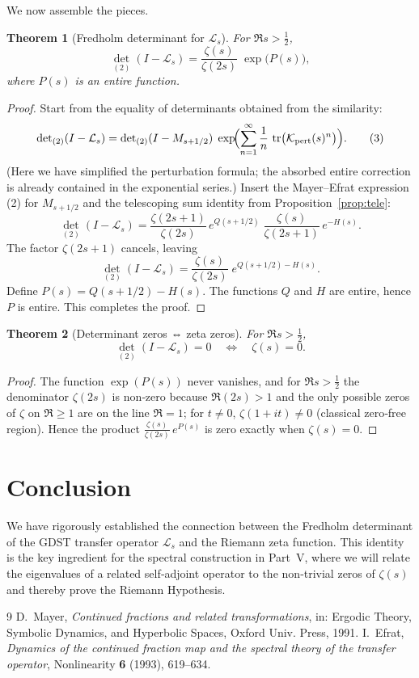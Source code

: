 \documentclass[11pt,a4paper]{article}
\newtheorem{theorem}{Theorem}[section]
\theoremstyle{definition}
\theoremstyle{remark}
\newcommand{\LOp}{\mathcal{L}}
\newcommand{\MOp}{M}
\newcommand{\KO}{\mathcal{K}}
\newcommand{\tr}{\operatorname{tr}}
\newcommand{\Det}{\operatorname{det}}
\begin{document}
We now assemble the pieces.

\begin{theorem}[Fredholm determinant for \(\LOp_s\)]\label{thm:fredholmL}
For \(\Re s > \frac12\),
\[
{\Det}_{(2)}(I - \LOp_s) = \frac{\zeta(s)}{\zeta(2s)}\; \exp\bigl(P(s)\bigr),
\]
where \(P(s)\) is an entire function.
\end{theorem}
\begin{proof}
Start from the equality of determinants obtained from the similarity:
\[
{\Det}_{(2)}(I - \LOp_s) = {\Det}_{(2)}(I - \MOp_{s+1/2})\;
\exp\!\Bigl( \sum_{n=1}^{\infty} \frac{1}{n}\, \tr\bigl( \KO_{\mathrm{pert}}(s)^n \bigr) \Bigr).
\tag{3}
\]
(Here we have simplified the perturbation formula; the absorbed entire correction is already contained in the exponential series.)
Insert the Mayer–Efrat expression (2) for \(\MOp_{s+1/2}\) and the telescoping sum identity from Proposition~\ref{prop:tele}:
\[
{\Det}_{(2)}(I - \LOp_s) = \frac{\zeta(2s+1)}{\zeta(2s)}\, e^{Q(s+1/2)}\;
\frac{\zeta(s)}{\zeta(2s+1)}\, e^{-H(s)}.
\]
The factor \(\zeta(2s+1)\) cancels, leaving
\[
{\Det}_{(2)}(I - \LOp_s) = \frac{\zeta(s)}{\zeta(2s)}\;
e^{Q(s+1/2) - H(s)}.
\]
Define \(P(s) = Q(s+1/2) - H(s)\). The functions \(Q\) and \(H\) are entire, hence \(P\) is entire. This completes the proof.
\end{proof}

\begin{theorem}[Determinant zeros ⇔ zeta zeros]\label{thm:zeros}
For \(\Re s > \frac12\),
\[
{\Det}_{(2)}(I - \LOp_s) = 0 \quad\Longleftrightarrow\quad \zeta(s) = 0.
\]
\end{theorem}
\begin{proof}
The function \(\exp(P(s))\) never vanishes, and for \(\Re s > \frac12\) the denominator \(\zeta(2s)\) is non‑zero because \(\Re(2s)>1\) and the only possible zeros of \(\zeta\) on \(\Re\ge1\) are on the line \(\Re=1\); for \(t\neq0\), \(\zeta(1+it)\neq0\) (classical zero‑free region). Hence the product \(\frac{\zeta(s)}{\zeta(2s)}\, e^{P(s)}\) is zero exactly when \(\zeta(s)=0\).
\end{proof}

\section{Conclusion}
We have rigorously established the connection between the Fredholm determinant of the GDST transfer operator \(\LOp_s\) and the Riemann zeta function. This identity is the key ingredient for the spectral construction in Part~V, where we will relate the eigenvalues of a related self‑adjoint operator to the non‑trivial zeros of \(\zeta(s)\) and thereby prove the Riemann Hypothesis.

\begin{thebibliography}{9}
D.~Mayer, \emph{Continued fractions and related transformations}, in: Ergodic Theory, Symbolic Dynamics, and Hyperbolic Spaces, Oxford Univ. Press, 1991.
I.~Efrat, \emph{Dynamics of the continued fraction map and the spectral theory of the transfer operator}, Nonlinearity \textbf{6} (1993), 619--634.
\end{thebibliography}
\end{document}
